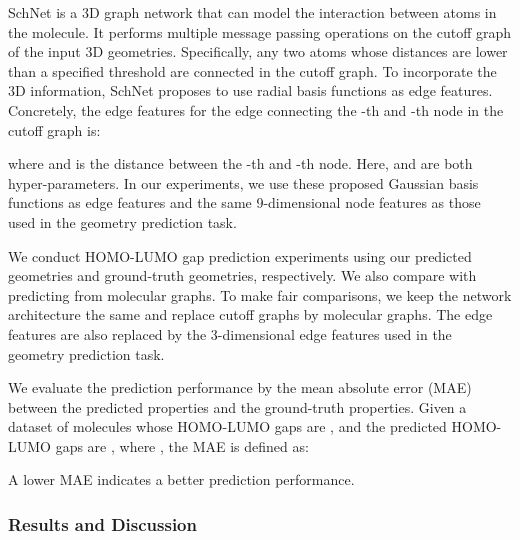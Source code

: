 \documentclass{article}
\begin{document}
SchNet is a 3D graph network that can model the interaction between atoms in the molecule. It performs multiple message passing operations on the cutoff graph of the input 3D geometries. Specifically, any two atoms whose distances are lower than a specified threshold  are connected in the cutoff graph. To incorporate the 3D information, SchNet proposes to use  radial basis functions as edge features. Concretely, the edge features for the edge connecting the -th and -th node in the cutoff graph is:

where  and  is the distance between the -th and -th node. Here,  and  are both hyper-parameters. In our experiments, we use these proposed Gaussian basis functions as edge features and the same 9-dimensional node features as those used in the geometry prediction task.

We conduct HOMO-LUMO gap prediction experiments using our predicted geometries and ground-truth geometries, respectively. We also compare with predicting from molecular graphs. To make fair comparisons, we keep the network architecture the same and replace cutoff graphs by molecular graphs. The edge features are also replaced by the 3-dimensional edge features used in the geometry prediction task.

We evaluate the prediction performance by the mean absolute error (MAE) between the predicted properties and the ground-truth properties. Given a dataset of  molecules whose HOMO-LUMO gaps are , and the predicted HOMO-LUMO gaps are , where , the MAE is defined as:

A lower MAE indicates a better prediction performance.

\subsubsection{Results and Discussion}
\end{document}
